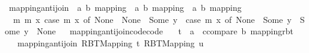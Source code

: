 \begin{isabellebody}
\endisatagproof
{\isafoldproof}%
%
\isadelimproof
\isanewline
%
\endisadelimproof
\isanewline
{}\isamarkupfalse%
\isanewline
\isanewline
{}\isamarkupfalse%
\ mapping{\isacharunderscore}{\kern0pt}antijoin\ {\isacharcolon}{\kern0pt}{\isacharcolon}{\kern0pt}\ {\isachardoublequoteopen}{\isacharparenleft}{\kern0pt}{\isacharprime}{\kern0pt}a{\isacharcomma}{\kern0pt}\ {\isacharprime}{\kern0pt}b{\isacharparenright}{\kern0pt}\ mapping\ {\isasymRightarrow}\ {\isacharparenleft}{\kern0pt}{\isacharprime}{\kern0pt}a{\isacharcomma}{\kern0pt}\ {\isacharprime}{\kern0pt}b{\isacharparenright}{\kern0pt}\ mapping\ {\isasymRightarrow}\ {\isacharparenleft}{\kern0pt}{\isacharprime}{\kern0pt}a{\isacharcomma}{\kern0pt}\ {\isacharprime}{\kern0pt}b{\isacharparenright}{\kern0pt}\ mapping{\isachardoublequoteclose}\ \isanewline
\ \ {\isachardoublequoteopen}{\isasymlambda}m\ m{\isacharprime}{\kern0pt}\ x{\isachardot}{\kern0pt}\ case\ m\ x\ of\ None\ {\isasymRightarrow}\ None\ {\isacharbar}{\kern0pt}\ Some\ y\ {\isasymRightarrow}\ {\isacharparenleft}{\kern0pt}case\ m{\isacharprime}{\kern0pt}\ x\ of\ None\ {\isasymRightarrow}\ Some\ y\ {\isacharbar}{\kern0pt}\ Some\ y{\isacharprime}{\kern0pt}\ {\isasymRightarrow}\ None{\isacharparenright}{\kern0pt}{\isachardoublequoteclose}%
\isadelimproof
\ %
\endisadelimproof
%
\isatagproof
\isacommand{{\isachardot}{\kern0pt}}\isamarkupfalse%
%
\endisatagproof
{\isafoldproof}%
%
\isadelimproof
%
\endisadelimproof
\isanewline
\isanewline
{}\isamarkupfalse%
\ mapping{\isacharunderscore}{\kern0pt}antijoin{\isacharunderscore}{\kern0pt}code{\isacharbrackleft}{\kern0pt}code{\isacharbrackright}{\kern0pt}{\isacharcolon}{\kern0pt}\isanewline
\ \ \ t\ {\isacharcolon}{\kern0pt}{\isacharcolon}{\kern0pt}\ {\isachardoublequoteopen}{\isacharparenleft}{\kern0pt}{\isacharprime}{\kern0pt}a\ {\isacharcolon}{\kern0pt}{\isacharcolon}{\kern0pt}\ ccompare{\isacharcomma}{\kern0pt}\ {\isacharprime}{\kern0pt}b{\isacharparenright}{\kern0pt}\ mapping{\isacharunderscore}{\kern0pt}rbt{\isachardoublequoteclose}\isanewline
\ \ \ {\isachardoublequoteopen}mapping{\isacharunderscore}{\kern0pt}antijoin\ {\isacharparenleft}{\kern0pt}RBT{\isacharunderscore}{\kern0pt}Mapping\ t{\isacharparenright}{\kern0pt}\ {\isacharparenleft}{\kern0pt}RBT{\isacharunderscore}{\kern0pt}Mapping\ u{\isacharparenright}{\kern0pt}\ {\isacharequal}{\kern0pt}\isanewline

\end{isabellebody}
